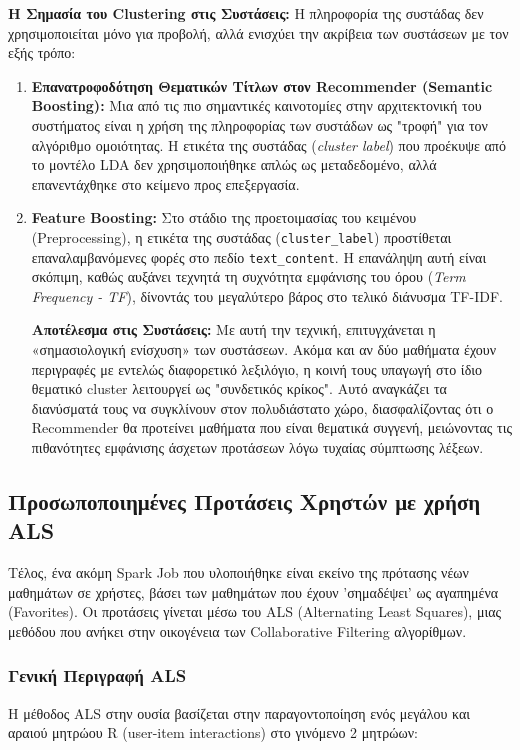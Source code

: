 \documentclass[a4paper,12pt]{article}
\begin{document}
\textbf{Η Σημασία του Clustering στις Συστάσεις:} 
Η πληροφορία της συστάδας δεν χρησιμοποιείται μόνο για προβολή, αλλά ενισχύει την ακρίβεια των συστάσεων με τον εξής τρόπο: 
\begin{enumerate} 
    \item \textbf{Επανατροφοδότηση Θεματικών Τίτλων στον Recommender (Semantic Boosting):} 
    Μια από τις πιο σημαντικές καινοτομίες στην αρχιτεκτονική του συστήματος είναι η χρήση της πληροφορίας των συστάδων ως "τροφή" για τον αλγόριθμο ομοιότητας. Η ετικέτα της συστάδας (\textit{cluster label}) που προέκυψε από το μοντέλο LDA δεν χρησιμοποιήθηκε απλώς ως μεταδεδομένο, αλλά επανεντάχθηκε στο κείμενο προς επεξεργασία.
    
    \item \textbf{Feature Boosting:} Στο στάδιο της προετοιμασίας του κειμένου (Preprocessing), η ετικέτα της συστάδας (\texttt{cluster\_label}) προστίθεται επαναλαμβανόμενες φορές στο πεδίο \texttt{text\_content}. Η επανάληψη αυτή είναι σκόπιμη, καθώς αυξάνει τεχνητά τη συχνότητα εμφάνισης του όρου (\textit{Term Frequency - TF}), δίνοντάς του μεγαλύτερο βάρος στο τελικό διάνυσμα TF-IDF.

    \textbf{Αποτέλεσμα στις Συστάσεις:}
    Με αυτή την τεχνική, επιτυγχάνεται η «σημασιολογική ενίσχυση» των συστάσεων. Ακόμα και αν δύο μαθήματα έχουν περιγραφές με εντελώς διαφορετικό λεξιλόγιο, η κοινή τους υπαγωγή στο ίδιο θεματικό cluster λειτουργεί ως "συνδετικός κρίκος". Αυτό αναγκάζει τα διανύσματά τους να συγκλίνουν στον πολυδιάστατο χώρο, διασφαλίζοντας ότι ο Recommender θα προτείνει μαθήματα που είναι θεματικά συγγενή, μειώνοντας τις πιθανότητες εμφάνισης άσχετων προτάσεων λόγω τυχαίας σύμπτωσης λέξεων.
\end{enumerate}

\subsection{Προσωποποιημένες Προτάσεις Χρηστών με χρήση ALS}
Τέλος, ένα ακόμη Spark Job που υλοποιήθηκε είναι εκείνο της πρότασης νέων μαθημάτων σε χρήστες, βάσει των μαθημάτων που έχουν 'σημαδέψει' ως αγαπημένα (Favorites). Οι προτάσεις γίνεται μέσω του ALS (Alternating Least Squares), μιας μεθόδου που ανήκει στην οικογένεια των Collaborative Filtering αλγορίθμων. 

\subsubsection{Γενική Περιγραφή ALS}
Η μέθοδος ALS στην ουσία βασίζεται στην παραγοντοποίηση ενός μεγάλου και αραιού μητρώου R (user-item interactions) στο γινόμενο 2 μητρώων:
\end{document}
